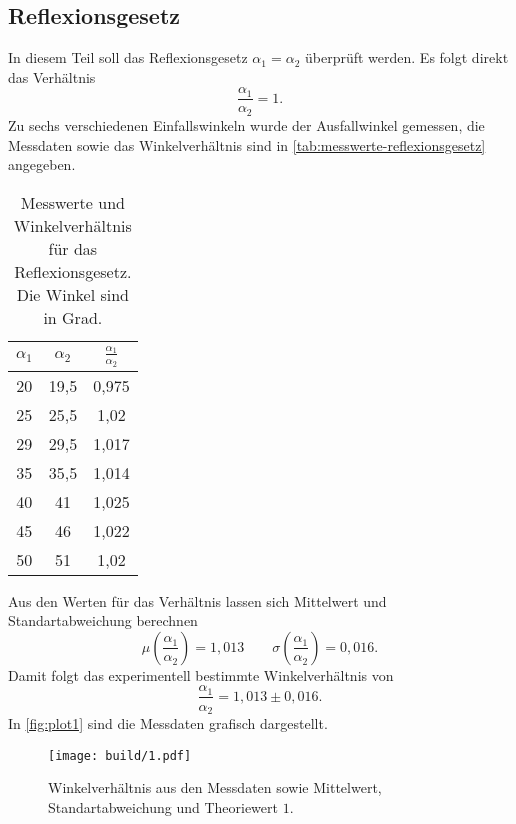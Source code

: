 \subsection{Reflexionsgesetz}
\label{sec:Reflexionsgesetz}
In diesem Teil soll das Reflexionsgesetz $\alpha_1 = \alpha_2$ überprüft werden. Es folgt
direkt das Verhältnis 
\begin{equation}
	\frac{\alpha_1}{\alpha_2} = 1.
\end{equation}
Zu sechs verschiedenen Einfallswinkeln wurde der Ausfallwinkel gemessen, die Messdaten
sowie das Winkelverhältnis
sind in \autoref{tab:messwerte-reflexionsgesetz} angegeben.
\begin{table}
	\centering
	\caption{Messwerte und Winkelverhältnis für das Reflexionsgesetz. Die Winkel sind
	in Grad.}
	\label{tab:messwerte-reflexionsgesetz}
	\begin{tabular}{c c c}
		\toprule
		$\alpha_1$ & $\alpha_2$ & $\frac{\alpha_1}{\alpha_2}$ \\
		\midrule
		20 & 19,5 & 0,975 \\
		25 & 25,5 & 1,02  \\
		29 & 29,5 & 1,017 \\
		35 & 35,5 & 1,014 \\
		40 & 41   & 1,025 \\
		45 & 46   & 1,022 \\
		50 & 51   & 1,02  \\
		\bottomrule
	\end{tabular}
\end{table}
Aus den Werten für das Verhältnis lassen sich Mittelwert und Standartabweichung berechnen
\begin{equation}
	\mu\left(\frac{\alpha_1}{\alpha_2}\right) = 1,013 
	\qquad
	\sigma\left(\frac{\alpha_1}{\alpha_2}\right) = 0,016.
	\label{eqn:ergebnis1}
\end{equation}
Damit folgt das experimentell bestimmte Winkelverhältnis von
\begin{equation}
	\frac{\alpha_1}{\alpha_2} = 1,013 \pm 0,016.
\end{equation}
In \autoref{fig:plot1} sind die Messdaten grafisch dargestellt.
\begin{figure}[H]
	\centering
	\texttt{[image: build/1.pdf]}
	\caption{Winkelverhältnis aus den Messdaten sowie Mittelwert, Standartabweichung
	und Theoriewert $1$.}
	\label{fig:plot1}
\end{figure}

